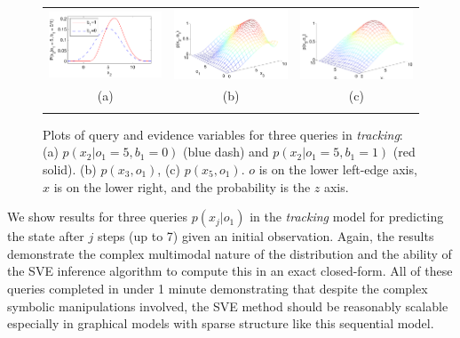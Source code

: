 \documentclass[letterpaper]{article}
\begin{document}
\begin{figure}[t!]
\begin{center}
\begin{tabular}{ccc}
\hspace{-3mm} \includegraphics[width=120pt]{radar_x_2_fix.pdf} & \hspace{-5mm} \includegraphics[width=120pt]{tracker_3d_x3o1_aistat.pdf} & \hspace{-4mm} \includegraphics[width=120pt]{tracker_3d_x5o1_aistat.pdf}\\ %
(a) & (b) & (c) \\
\multicolumn{3}{c}{}
\end{tabular}
\end{center}
\vspace{-6mm}
\caption{\footnotesize Plots of query and evidence variables for three
queries in \emph{tracking}: (a)  $p(x_2|o_1=5,b_1=0)$ (blue dash)
and $p(x_2|o_1=5,b_1=1)$ (red solid).
(b) $p(x_3,o_1)$, (c) $p(x_5,o_1)$.  $o$ is on the lower left-edge
axis, $x$ is on the lower right, and the probability is the $z$ axis.}
\label{fig:track}
\end{figure}

We show results for three queries $p(x_j|o_1)$ in the \emph{tracking}
model for predicting the state after $j$ steps (up to 7) given an
initial observation.  Again, the results demonstrate the complex
multimodal nature of the distribution and the ability of the SVE
inference algorithm to compute this in an exact closed-form.  All of
these queries completed in under 1 minute demonstrating that despite
the complex symbolic manipulations involved, the SVE method should be
reasonably scalable especially in graphical models with sparse
structure like this sequential model.
\end{document}
